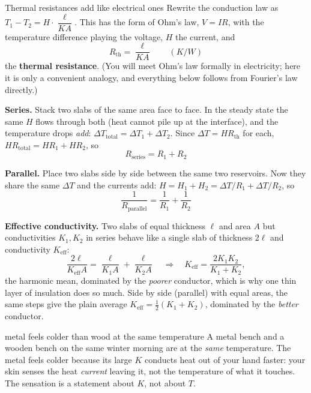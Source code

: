 \begin{derivbox}{Thermal resistances add like electrical ones}
Rewrite the conduction law as $T_1-T_2 = H\cdot\dfrac{\ell}{KA}$. This has the form of Ohm's law,
$V = IR$, with the temperature difference playing the voltage, $H$ the current, and
\[
R_{\text{th}} = \frac{\ell}{KA}\qquad(\si{K/W})
\]
the \textbf{thermal resistance}. (You will meet Ohm's law formally in electricity; here it is only a
convenient analogy, and everything below follows from Fourier's law directly.)

 \textbf{Series.} Stack two slabs of the same area face to face. In the steady state the same
$H$ flows through both (heat cannot pile up at the interface), and the temperature drops \emph{add}:
$\Delta T_{\text{total}} = \Delta T_1 + \Delta T_2$. Since $\Delta T = H R_{\text{th}}$ for each,
$H R_{\text{total}} = HR_1 + HR_2$, so
\[
\boxed{\;R_{\text{series}} = R_1 + R_2\;}
\]

 \textbf{Parallel.} Place two slabs side by side between the same two reservoirs. Now they
share the same $\Delta T$ and the currents add: $H=H_1+H_2=\Delta T/R_1+\Delta T/R_2$, so
\[
\boxed{\;\frac{1}{R_{\text{parallel}}} = \frac{1}{R_1} + \frac{1}{R_2}\;}
\]

 \textbf{Effective conductivity.} Two slabs of equal thickness $\ell$ and area $A$ but
conductivities $K_1, K_2$ in series behave like a single slab of thickness $2\ell$ and conductivity
$K_{\text{eff}}$:
\[
\frac{2\ell}{K_{\text{eff}}A} = \frac{\ell}{K_1 A} + \frac{\ell}{K_2 A}
\quad\Longrightarrow\quad
K_{\text{eff}} = \frac{2K_1K_2}{K_1+K_2},
\]
the harmonic mean, dominated by the \emph{poorer} conductor, which is why one thin layer of insulation
does so much. Side by side (parallel) with equal areas, the same steps give the plain average
$K_{\text{eff}}=\tfrac12(K_1+K_2)$, dominated by the \emph{better} conductor.
\end{derivbox}


\begin{trapbox}{metal feels colder than wood at the same temperature}
A metal bench and a wooden bench on the same winter morning are at the \emph{same} temperature. The
metal feels colder because its large $K$ conducts heat out of your hand faster: your skin senses the
heat \emph{current} leaving it, not the temperature of what it touches. The sensation is a statement
about $K$, not about $T$.
\end{trapbox}

